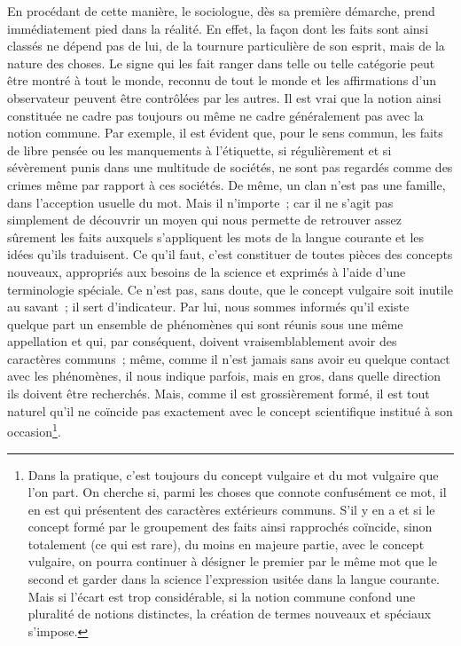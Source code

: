 \documentclass[french,twoside]{book} %
\begin{document}
En procédant de cette manière, le sociologue, dès sa première démarche, prend immédiatement pied dans la réalité. En effet, la façon dont les faits sont ainsi classés ne dépend pas de lui, de la tournure particulière de son esprit, mais de la nature des choses. Le signe qui les fait ranger dans telle ou telle catégorie peut être montré à tout le monde, reconnu de tout le monde et les affirmations d’un observateur peuvent être contrôlées par les autres. Il est vrai que la notion ainsi constituée ne cadre pas toujours ou même ne cadre généralement pas avec la notion commune. Par exemple, il est évident que, pour le sens commun, les faits de libre pensée ou les manquements à l’étiquette, si régulièrement et si sévèrement punis dans une multitude de sociétés, ne sont pas regardés comme des crimes même par rapport à ces sociétés. De même, un clan n’est pas une famille, dans l’acception usuelle du mot. Mais il n’importe ; car il ne s’agit pas simplement de découvrir un moyen qui nous permette de retrouver assez sûrement les faits auxquels s’appliquent les mots de la langue courante et les idées qu’ils traduisent. Ce qu’il faut, c’est constituer de toutes pièces des concepts nouveaux, appropriés aux besoins de la science et exprimés à l’aide d’une terminologie spéciale. Ce n’est pas, sans doute, que le concept vulgaire soit inutile au savant ; il sert d’indicateur. Par lui, nous sommes informés qu’il existe quelque part un ensemble de phénomènes qui sont réunis sous une même appellation et qui, par conséquent, doivent vraisemblablement avoir des caractères communs ; même, comme il n’est jamais sans avoir eu quelque contact avec les phénomènes, il nous indique parfois, mais en gros, dans quelle direction ils doivent être recherchés. Mais, comme il est grossièrement formé, il est tout naturel qu’il ne coïncide pas exactement avec le concept scientifique institué à son occasion\footnote{ Dans la pratique, c’est toujours du concept vulgaire et du mot vulgaire que l’on part. On cherche si, parmi les choses que connote confusément ce mot, il en est qui présentent des caractères extérieurs communs. S’il y en a et si le concept formé par le groupement des faits ainsi rapprochés coïncide, sinon totalement (ce qui est rare), du moins en majeure partie, avec le concept vulgaire, on pourra continuer à désigner le premier par le même mot que le second et garder dans la science l’expression usitée dans la langue courante. Mais si l’écart est trop considérable, si la notion commune confond une pluralité de notions distinctes, la création de termes nouveaux et spéciaux s’impose.}.\par
\end{document}
